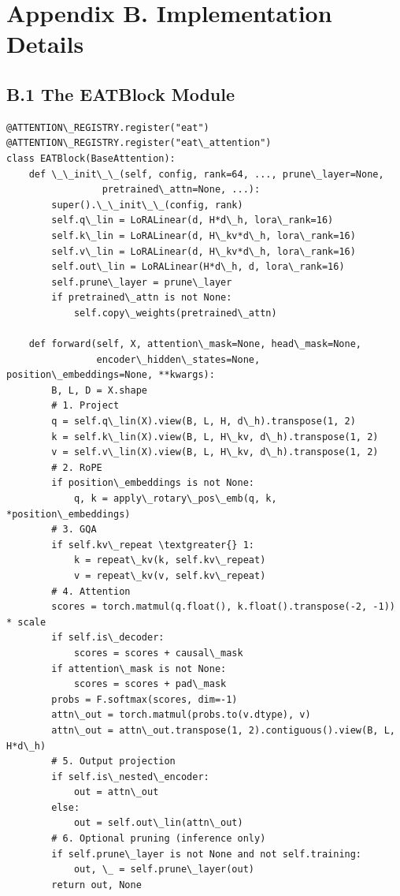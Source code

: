 
\section{Appendix B. Implementation Details}

\subsection{B.1 The EATBlock Module}

\begin{lstlisting}
@ATTENTION\_REGISTRY.register("eat")
@ATTENTION\_REGISTRY.register("eat\_attention")
class EATBlock(BaseAttention):
    def \_\_init\_\_(self, config, rank=64, ..., prune\_layer=None,
                 pretrained\_attn=None, ...):
        super().\_\_init\_\_(config, rank)
        self.q\_lin = LoRALinear(d, H*d\_h, lora\_rank=16)
        self.k\_lin = LoRALinear(d, H\_kv*d\_h, lora\_rank=16)
        self.v\_lin = LoRALinear(d, H\_kv*d\_h, lora\_rank=16)
        self.out\_lin = LoRALinear(H*d\_h, d, lora\_rank=16)
        self.prune\_layer = prune\_layer
        if pretrained\_attn is not None:
            self.copy\_weights(pretrained\_attn)
    
    def forward(self, X, attention\_mask=None, head\_mask=None,
                encoder\_hidden\_states=None, position\_embeddings=None, **kwargs):
        B, L, D = X.shape
        # 1. Project
        q = self.q\_lin(X).view(B, L, H, d\_h).transpose(1, 2)
        k = self.k\_lin(X).view(B, L, H\_kv, d\_h).transpose(1, 2)
        v = self.v\_lin(X).view(B, L, H\_kv, d\_h).transpose(1, 2)
        # 2. RoPE
        if position\_embeddings is not None:
            q, k = apply\_rotary\_pos\_emb(q, k, *position\_embeddings)
        # 3. GQA
        if self.kv\_repeat \textgreater{} 1:
            k = repeat\_kv(k, self.kv\_repeat)
            v = repeat\_kv(v, self.kv\_repeat)
        # 4. Attention
        scores = torch.matmul(q.float(), k.float().transpose(-2, -1)) * scale
        if self.is\_decoder:
            scores = scores + causal\_mask
        if attention\_mask is not None:
            scores = scores + pad\_mask
        probs = F.softmax(scores, dim=-1)
        attn\_out = torch.matmul(probs.to(v.dtype), v)
        attn\_out = attn\_out.transpose(1, 2).contiguous().view(B, L, H*d\_h)
        # 5. Output projection
        if self.is\_nested\_encoder:
            out = attn\_out
        else:
            out = self.out\_lin(attn\_out)
        # 6. Optional pruning (inference only)
        if self.prune\_layer is not None and not self.training:
            out, \_ = self.prune\_layer(out)
        return out, None
\end{lstlisting}

